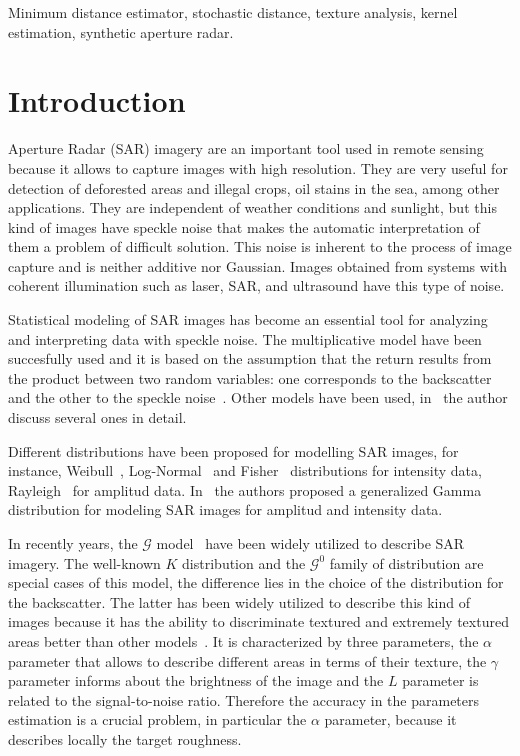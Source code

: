 \documentclass[journal]{IEEEtran}
\numberwithin{equation}{section}
\begin{document}
\begin{keywords}
Minimum distance estimator, stochastic distance, texture analysis, kernel estimation, synthetic aperture radar.
\end{keywords}

\IEEEpeerreviewmaketitle

\section{Introduction}
\label{intro}
 Aperture Radar (SAR) imagery are an important tool used in
remote sensing because it allows to capture images with high resolution. They are very useful for detection of deforested areas and illegal crops, oil stains in the sea, among other applications. They are independent of weather conditions and sunlight, but this kind of images have speckle noise that makes the automatic interpretation of them a problem of difficult solution. This noise is inherent to the process of image capture and is neither additive nor Gaussian. Images obtained from systems with coherent illumination such as laser, SAR, and ultrasound have this type of noise.

Statistical modeling of SAR images has become an essential tool for analyzing and interpreting data with speckle noise. The multiplicative model have been succesfully used and it is based on the assumption that the return results from the product between two random variables: one corresponds to the backscatter and the other to the speckle noise~\cite{oliverquegan98}. Other models have been used, in~\cite{Gao2010} the author discuss several ones in detail.

Different distributions have been proposed for modelling SAR images, for instance, Weibull~\cite{Oliver1993}, Log-Normal~\cite{oliverquegan98} and Fisher~\cite{Tison2004} distributions for intensity data, Rayleigh~\cite{oliverquegan98} for amplitud data. In~\cite{Li2011} the authors proposed a generalized Gamma distribution for modeling SAR images for amplitud and intensity data.

In recently years, the $\mathcal G$ model~\cite{Frery97} have been widely utilized to describe SAR imagery. The well-known $K$ distribution and the $\mathcal G^0$ family of distribution are special cases of this model, the difference lies in the choice of the distribution for the backscatter.  The latter has been widely utilized to describe this kind of images because it has the ability to discriminate textured and extremely textured areas better than other models~\cite{MejailJacoboFreryBustos:IJRS}. It is characterized by three parameters, the $\alpha$ parameter that allows to describe different areas in terms of their texture, the $\gamma$ parameter informs about the brightness of the image and the $L$ parameter is related to the signal-to-noise ratio. Therefore the accuracy in the parameters estimation is a crucial problem, in particular the $\alpha$ parameter, because it describes locally the target roughness.
\end{document}
